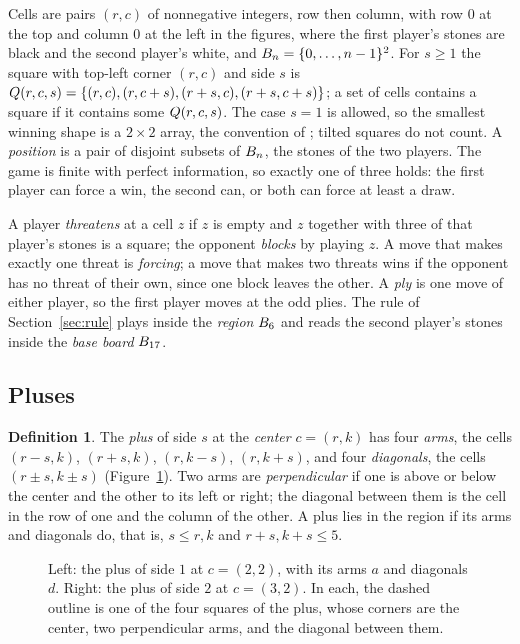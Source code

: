 \documentclass[11pt]{amsart}
\theoremstyle{definition}
\newtheorem{definition}[theorem]{Definition}
\theoremstyle{remark}
\begin{document}
Cells are pairs $(r,c)$ of nonnegative integers, row then column,
with row $0$ at the top and column $0$ at the left in the figures,
where the first player's stones are black and the second player's
white, and $B_n = \{0,\dots,n-1\}^2$. For $s \ge 1$ the square
with top-left corner $(r,c)$ and side $s$ is
$Q(r,c,s) = \{(r,c), (r,c+s), (r+s,c), (r+s,c+s)\}$; a set of cells
contains a square if it contains some $Q(r,c,s)$. The case $s = 1$ is
allowed, so the smallest winning shape is a $2 \times 2$ array, the
convention of \cite{bacher-eliahou, jenrich}; tilted squares do not
count. A \emph{position} is a pair of disjoint subsets of $B_n$,
the stones of the two players. The game is finite with perfect
information, so exactly one of three holds: the first player can force
a win, the second can, or both can force at least a draw.

A player \emph{threatens} at a cell $z$ if $z$ is empty and $z$
together with three of that player's stones is a square; the opponent
\emph{blocks} by playing $z$. A move that makes exactly one threat is
\emph{forcing}; a move that makes two threats wins if the opponent has
no threat of their own, since one block leaves the other. A \emph{ply} is one move of either player,
so the first player moves at the odd plies. The rule of
Section~\ref{sec:rule} plays inside the \emph{region} $B_6$ and
reads the second player's stones inside the \emph{base board}
$B_{17}$.

\subsection{Pluses}

\begin{definition}\label{def:plus}
The \emph{plus} of side $s$ at the \emph{center} $c = (r,k)$ has four
\emph{arms}, the cells $(r-s,k)$, $(r+s,k)$, $(r,k-s)$, $(r,k+s)$, and
four \emph{diagonals}, the cells $(r \pm s, k \pm s)$
(Figure~\ref{fig:anatomy}). Two arms are \emph{perpendicular} if one
is above or below the center and the other to its left or right; the
diagonal between them is the cell in the row of one and the column of
the other. A plus lies in the region if its arms and diagonals do, that
is, $s \le r, k$ and $r+s, k+s \le 5$.
\end{definition}

\begin{figure}[ht]
\centering

\caption{Left: the plus of side $1$ at $c = (2,2)$, with its arms $a$
and diagonals $d$. Right: the plus of side $2$ at $c = (3,2)$. In each,
the dashed outline is one of the four squares of the plus, whose
corners are the center, two perpendicular arms, and the diagonal
between them.}
\label{fig:anatomy}
\end{figure}
\end{document}
